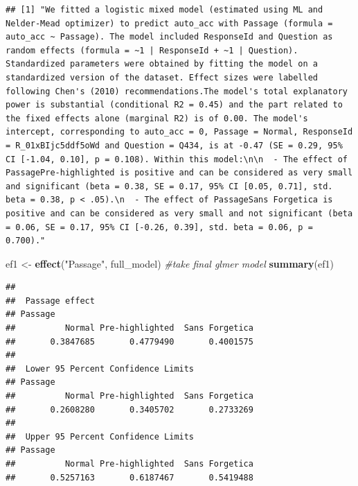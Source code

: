 \documentclass[pdf]{apa6}
\newenvironment{Shaded}{\begin{snugshade}}{\end{snugshade}}
\newcommand{\CommentTok}[1]{\textcolor[rgb]{0.56,0.35,0.01}{\textit{#1}}}
\newcommand{\KeywordTok}[1]{\textcolor[rgb]{0.13,0.29,0.53}{\textbf{#1}}}
\newcommand{\NormalTok}[1]{#1}
\newcommand{\StringTok}[1]{\textcolor[rgb]{0.31,0.60,0.02}{#1}}
\begin{document}
\begin{verbatim}
## [1] "We fitted a logistic mixed model (estimated using ML and Nelder-Mead optimizer) to predict auto_acc with Passage (formula = auto_acc ~ Passage). The model included ResponseId and Question as random effects (formula = ~1 | ResponseId + ~1 | Question). Standardized parameters were obtained by fitting the model on a standardized version of the dataset. Effect sizes were labelled following Chen's (2010) recommendations.The model's total explanatory power is substantial (conditional R2 = 0.45) and the part related to the fixed effects alone (marginal R2) is of 0.00. The model's intercept, corresponding to auto_acc = 0, Passage = Normal, ResponseId = R_01xBIjc5ddf5oWd and Question = Q434, is at -0.47 (SE = 0.29, 95% CI [-1.04, 0.10], p = 0.108). Within this model:\n\n  - The effect of PassagePre-highlighted is positive and can be considered as very small and significant (beta = 0.38, SE = 0.17, 95% CI [0.05, 0.71], std. beta = 0.38, p < .05).\n  - The effect of PassageSans Forgetica is positive and can be considered as very small and not significant (beta = 0.06, SE = 0.17, 95% CI [-0.26, 0.39], std. beta = 0.06, p = 0.700)."
\end{verbatim}

\begin{Shaded}
\begin{Highlighting}[]
\NormalTok{ef1 <-}\StringTok{ }\KeywordTok{effect}\NormalTok{(}\StringTok{"Passage"}\NormalTok{, full_model) }\CommentTok{#take final glmer model }
\KeywordTok{summary}\NormalTok{(ef1)}
\end{Highlighting}
\end{Shaded}

\begin{verbatim}
## 
##  Passage effect
## Passage
##          Normal Pre-highlighted  Sans Forgetica 
##       0.3847685       0.4779490       0.4001575 
## 
##  Lower 95 Percent Confidence Limits
## Passage
##          Normal Pre-highlighted  Sans Forgetica 
##       0.2608280       0.3405702       0.2733269 
## 
##  Upper 95 Percent Confidence Limits
## Passage
##          Normal Pre-highlighted  Sans Forgetica 
##       0.5257163       0.6187467       0.5419488
\end{verbatim}
\end{document}
